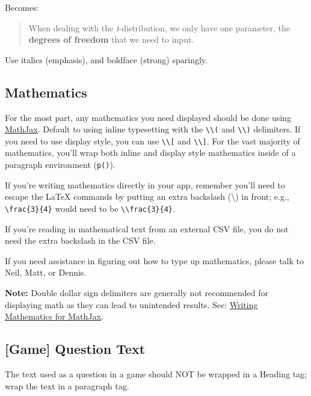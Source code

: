 \documentclass[
]{book}
\begin{document}
Becomes:

\begin{quote}
When dealing with the \emph{t}-distribution, we only have one parameter, the \textbf{degrees of freedom} that we need to input.
\end{quote}

Use italics (emphasis), and boldface (strong) sparingly.

\hypertarget{mathematics}{%
\subsection{Mathematics}\label{mathematics}}

For the most part, any mathematics you need displayed should be done using \href{https://www.mathjax.org/}{MathJax}. Default to using inline typesetting with the \texttt{\textbackslash{}\textbackslash{}(} and \texttt{\textbackslash{}\textbackslash{})} delimiters. If you need to use display style, you can use \texttt{\textbackslash{}\textbackslash{}{[}} and \texttt{\textbackslash{}\textbackslash{}{]}}. For the vast majority of mathematics, you'll wrap both inline and display style mathematics inside of a paragraph environment (\texttt{p()}).

If you're writing mathematics directly in your app, remember you'll need to escape the LaTeX commands by putting an extra backslash (\textbackslash) in front; e.g., \texttt{\textbackslash{}frac\{3\}\{4\}} would need to be \texttt{\textbackslash{}\textbackslash{}frac\{3\}\{4\}}.

If you're reading in mathematical text from an external CSV file, you do not need the extra backslash in the CSV file.

If you need assistance in figuring out how to type up mathematics, please talk to Neil, Matt, or Dennis.

\textbf{Note:} Double dollar sign delimiters are generally not recommended for displaying math as they can lead to unintended results. See: \href{https://docs.mathjax.org/en/latest/basic/mathematics.html}{Writing Mathematics for MathJax}.

\hypertarget{game-question-text}{%
\subsection{{[}Game{]} Question Text}\label{game-question-text}}

The text used as a question in a game should NOT be wrapped in a Heading tag; wrap the text in a paragraph tag.
\end{document}
